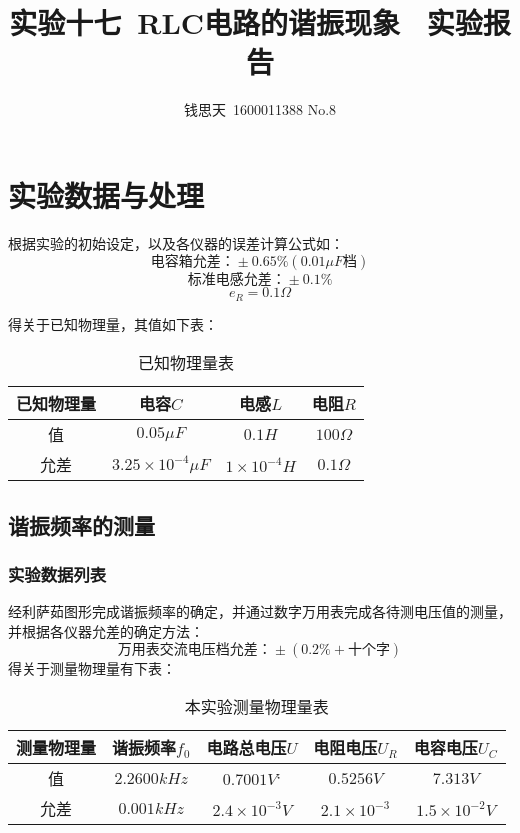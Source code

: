 \documentclass{ctexart}
\author{钱思天\ 1600011388 No.8}
\title{实验十七\ RLC电路的谐振现象 \ 实验报告}
\begin{document}
      \maketitle
      \section{实验数据与处理}
      根据实验的初始设定，以及各仪器的误差计算公式如：$$\mbox{电容箱允差：}\pm0.65\%(0.01\mu F\mbox{档})$$
          $$\mbox{标准电感允差：}\pm0.1\%$$
          $$e_R=0.1\Omega$$      
      
          得关于已知物理量，其值如下表：
\begin{table}[H]
  \centering
  \caption{已知物理量表}
    \begin{tabular}{|c|c|c|c|}\hline
    已知物理量 & 电容$C$ & 电感$L$ & 电阻$R$ \\\hline
    值     & $0.05\mu F$ & $0.1H$ & $100\Omega$ \\\hline
    允差    & $3.25\times 10^{-4}\mu F$ & $1\times 10^{-4}H$ & $0.1\Omega $ \\\hline
    \end{tabular}%
  \label{tab:addlabel}%
\end{table}%
      \subsection{谐振频率的测量}
      \subsubsection{实验数据列表}
        
经利萨茹图形完成谐振频率的确定，并通过数字万用表完成各待测电压值的测量，并根据各仪器允差的确定方法：
$$\mbox{万用表交流电压档允差：}\pm(0.2\%+\mbox{十个字})$$
得关于测量物理量有下表：
\begin{table}[H]
  \centering
  \caption{本实验测量物理量表}
    \begin{tabular}{|c|c|c|c|c|}\hline
    测量物理量 & 谐振频率$f_0$ & 电路总电压$U$ & 电阻电压$U_R$ & 电容电压$U_C$ \\\hline
    值     & $2.2600kHz$ & $0.7001V$` & $0.5256V$ & $7.313V$ \\\hline
    允差    & $0.001kHz$ & $2.4\times 10^{-3}V$ & $2.1\times10^{-3}$ & $1.5\times10^{-2}V$ \\\hline
    \end{tabular}%
  \label{tab:addlabel}%
\end{table}%
\end{document}
